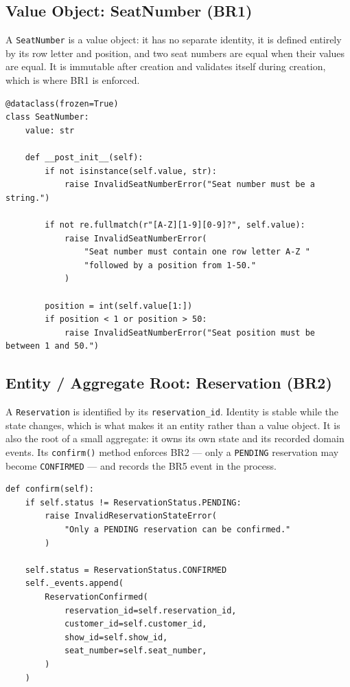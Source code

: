 \documentclass[11pt,a4paper]{article}
\newcommand{\code}[1]{\texttt{#1}}
\begin{document}
\subsection{Value Object: SeatNumber (BR1)}

A \code{SeatNumber} is a value object: it has no separate identity, it is
defined entirely by its row letter and position, and two seat numbers are equal
when their values are equal. It is immutable after creation and validates
itself during creation, which is where BR1 is enforced.

\begin{lstlisting}[style=python,caption={\code{SeatNumber}\ --- BR1 enforced in the value object's constructor.},label=lst:br1]
@dataclass(frozen=True)
class SeatNumber:
    value: str

    def __post_init__(self):
        if not isinstance(self.value, str):
            raise InvalidSeatNumberError("Seat number must be a string.")

        if not re.fullmatch(r"[A-Z][1-9][0-9]?", self.value):
            raise InvalidSeatNumberError(
                "Seat number must contain one row letter A-Z "
                "followed by a position from 1-50."
            )

        position = int(self.value[1:])
        if position < 1 or position > 50:
            raise InvalidSeatNumberError("Seat position must be between 1 and 50.")
\end{lstlisting}

\subsection{Entity / Aggregate Root: Reservation (BR2)}

A \code{Reservation} is identified by its \code{reservation\_id}. Identity is
stable while the state changes, which is what makes it an entity rather than a
value object. It is also the root of a small aggregate: it owns its own state
and its recorded domain events. Its \code{confirm()} method enforces BR2 ---
only a \code{PENDING} reservation may become \code{CONFIRMED} --- and records
the BR5 event in the process.

\begin{lstlisting}[style=python,caption={\code{Reservation.confirm()}\ --- BR2 state machine and BR5 event recording.},label=lst:br2]
def confirm(self):
    if self.status != ReservationStatus.PENDING:
        raise InvalidReservationStateError(
            "Only a PENDING reservation can be confirmed."
        )

    self.status = ReservationStatus.CONFIRMED
    self._events.append(
        ReservationConfirmed(
            reservation_id=self.reservation_id,
            customer_id=self.customer_id,
            show_id=self.show_id,
            seat_number=self.seat_number,
        )
    )
\end{lstlisting}
\end{document}
